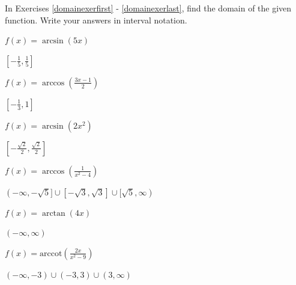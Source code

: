\documentclass{ximera}
\begin{document}
\begin{question}

In Exercises \ref{domainexerfirst} - \ref{domainexerlast}, find the domain of the given function.  Write your answers in interval notation.

\begin{problem} \label{domainexerfirst}
$f(x) = \arcsin(5x)$

\begin{solution}
$\left[-\frac{1}{5}, \frac{1}{5}\right]$
\end{solution}
\end{problem}

\begin{problem}
$f(x) = \arccos\left(\frac{3x-1}{2} \right)$

\begin{solution}
$\left[-\frac{1}{3}, 1 \right]$
\end{solution}
\end{problem}

\begin{problem}
$f(x) = \arcsin\left(2x^2\right)$ 

\begin{solution}
$\left[-\frac{\sqrt{2}}{2}, \frac{\sqrt{2}}{2}\right]$ 
\end{solution}
\end{problem}

\begin{problem}
$f(x) = \arccos\left(\frac{1}{x^2-4}\right)$

\begin{solution}
$(-\infty, -\sqrt{5}] \cup [-\sqrt{3}, \sqrt{3}] \cup [\sqrt{5}, \infty)$ 
\end{solution}
\end{problem}

\begin{problem}
$f(x) = \arctan(4x)$

\begin{solution}
$(-\infty, \infty)$
\end{solution}
\end{problem}

\begin{problem}  $f(x) = \text{arccot}\left(\frac{2x}{x^2-9}\right)$

\begin{solution}
$(-\infty, -3) \cup (-3,3) \cup (3, \infty)$
\end{solution}
\end{problem}


\end{question}
\end{document}
